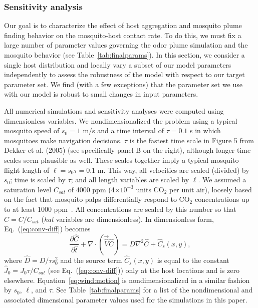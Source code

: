 \documentclass[10pt]{article}
\begin{document}
\subsubsection*{Sensitivity analysis}\label{sec:SA}
Our goal is to characterize the effect of host aggregation and mosquito plume finding behavior on the mosquito-host contact rate. To do this, we must fix a large number of parameter values governing the odor plume simulation and the mosquito behavior (see Table~\ref{tab:finalparams}). In this section, we consider a single host distribution and locally vary a subset of our model parameters independently to assess the robustness of the model with respect to our target parameter set. We find (with a few exceptions) that the parameter set we use with our model is robust to small changes in input parameters.

All numerical simulations and sensitivity analyses were computed using dimensionless variables.
We nondimensionalized  the problem using a typical
mosquito speed of $s_0 = 1$ m/s and a time
interval of $\tau = 0.1$ s in which mosquitoes make navigation
decisions. $\tau$ is the fastest time scale in
Figure 5 from Dekker et al. (2005) (see specifically panel B on
the right), although longer time scales seem plausible as well.
These scales together imply a typical mosquito flight length of
$\ell = s_0 \tau = 0.1$ m.  This way, all velocities are scaled (divided) by $s_0$; time is scaled by $\tau$; and all length variables are scaled by $\ell$.  We assumed a saturation level $C_{sat}$ of 4000 ppm (4$\times 10^{-3}$ units CO$_2$ per unit air), loosely based on the fact that mosquito palps differentially respond to CO$_2$ concentrations up to at least 1000 ppm~\cite{Grant1995}.  All concentrations are scaled by this number so that $\hat{C} = C/C_{sat}$ ({\em hat} variables are dimensionless).
%
In dimensionless form,
Eq.~(\ref{eq:conv-diff}) becomes
\begin{equation}\label{eq:conv-diff2}
\frac{\partial \hat{C}}{\partial \hat{t}} + \nabla\cdot ( \vec{\hat{V}} \hat{C} ) = {\hat D}\nabla^2 \hat{C} + \hat{C}_s(x,y),
\end{equation}
where ${\hat D} = D/\tau s_0^2$ and the source term $\hat{C}_s(x,y)$ is equal to
the constant $\hat{J}_0 = J_0\tau/C_{sat}$ (see Eq.~(\ref{eq:conv-diff})) only at the host 
locations and is zero elsewhere.
Equation~\eqref{eq:wind:motion} is nondimensionalized in a similar fashion by $s_0$, $\ell$, and $\tau$. See Table~\ref{tab:finalparams} for a list of the nondimensional and associated dimensional parameter values used for the simulations in this paper.
\end{document}
